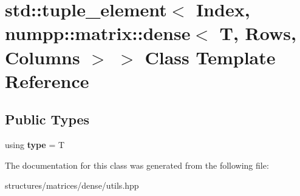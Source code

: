 \hypertarget{classstd_1_1tuple__element_3_01Index_00_01numpp_1_1matrix_1_1dense_3_01T_00_01Rows_00_01Columns_01_4_01_4}{}\section{std\+:\+:tuple\+\_\+element$<$ Index, numpp\+:\+:matrix\+:\+:dense$<$ T, Rows, Columns $>$ $>$ Class Template Reference}
\label{classstd_1_1tuple__element_3_01Index_00_01numpp_1_1matrix_1_1dense_3_01T_00_01Rows_00_01Columns_01_4_01_4}
\subsection*{Public Types}
\begin{DoxyCompactItemize}
\item 
\mbox{\label{classstd_1_1tuple__element_3_01Index_00_01numpp_1_1matrix_1_1dense_3_01T_00_01Rows_00_01Columns_01_4_01_4_ab20c679139daa766e0c650017831977f}} 
using {\bfseries type} = T
\end{DoxyCompactItemize}


The documentation for this class was generated from the following file\+:\begin{DoxyCompactItemize}
\item 
structures/matrices/dense/utils.\+hpp\end{DoxyCompactItemize}

